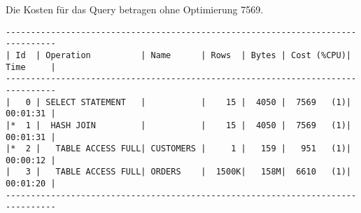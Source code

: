 \documentclass[11pt,a4paper,parskip=half]{scrartcl}
\begin{document}
Die Kosten für das Query betragen ohne Optimierung 7569.
\begin{lstlisting}
--------------------------------------------------------------------------------                                                                                                                                                                                                                             
| Id  | Operation          | Name      | Rows  | Bytes | Cost (%CPU)| Time     |                                                                                                                                                                                                                             
--------------------------------------------------------------------------------                                                                                                                                                                                                                             
|   0 | SELECT STATEMENT   |           |    15 |  4050 |  7569   (1)| 00:01:31 |                                                                                                                                                                                                                             
|*  1 |  HASH JOIN         |           |    15 |  4050 |  7569   (1)| 00:01:31 |                                                                                                                                                                                                                             
|*  2 |   TABLE ACCESS FULL| CUSTOMERS |     1 |   159 |   951   (1)| 00:00:12 |                                                                                                                                                                                                                             
|   3 |   TABLE ACCESS FULL| ORDERS    |  1500K|   158M|  6610   (1)| 00:01:20 |                                                                                                                                                                                                                             
--------------------------------------------------------------------------------                                                                                                                                                                                                                             
                                                                                                                                                                                                                                                                                                             

\end{lstlisting}
\end{document}
